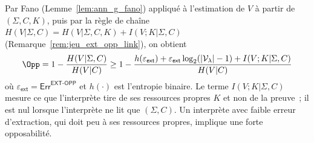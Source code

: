 \begin{sloppypar}
\begin{remark}
\label{rem:ann_ext_opp_link}
Par Fano (Lemme~\ref{lem:ann_g_fano}) appliqu\'e \`a l'estimation de $V$ \`a
partir de $(\Sigma,C,K)$, puis par la r\`egle de cha\^ine
$H(V|\Sigma,C) = H(V|\Sigma,C,K) + I(V;K|\Sigma,C)$
(Remarque~\ref{rem:jeu_ext_opp_link}), on obtient
\begin{equation}
\Opp = 1 - \frac{H(V|\Sigma,C)}{H(V|C)}
\geq 1 - \frac{h(\varepsilon_{\mathsf{ext}})
  + \varepsilon_{\mathsf{ext}}\log_2(|\mathcal{V}_\lambda|-1)
  + I(V;K|\Sigma,C)}
  {H(V|C)}
\label{eq:ann_fano_opp}
\end{equation}
o\`u $\varepsilon_{\mathsf{ext}} = \mathsf{Err}^{\mathsf{EXT\text{-}OPP}}$
et $h(\cdot)$ est l'entropie binaire. Le terme $I(V;K|\Sigma,C)$ mesure ce que
l'interpr\`ete tire de ses ressources propres $K$ et non de la preuve~; il est nul
lorsque l'interpr\`ete ne lit que $(\Sigma,C)$.
Un interpr\`ete avec faible erreur d'extraction, qui doit peu \`a ses ressources propres,
implique une forte opposabilit\'e.
\end{remark}
\end{sloppypar}

